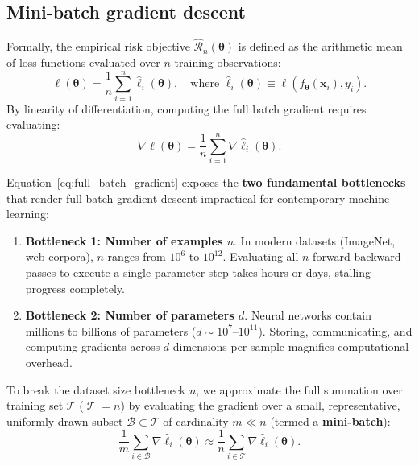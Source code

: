 \subsection{Mini-batch gradient descent}
\label{sec:two_bottlenecks_gd}
\label{sec:gradient_estimators_taxonomy}
\label{sec:algorithmic_cycle_epochs}

Formally, the empirical risk objective $\hat{\mathcal{R}}_n(\boldsymbol{\theta})$ is defined as the arithmetic mean of loss functions evaluated over $n$ training observations:
\begin{equation}
\ell(\boldsymbol{\theta}) = \frac{1}{n} \sum_{i=1}^n \hat{\ell}_i(\boldsymbol{\theta}), \quad \text{where } \hat{\ell}_i(\boldsymbol{\theta}) \equiv \ell(f_{\boldsymbol{\theta}}(\mathbf{x}_i), y_i).
\label{eq:sum_loss_structure}
\end{equation}
By linearity of differentiation, computing the full batch gradient requires evaluating:
\begin{equation}
\nabla \ell(\boldsymbol{\theta}) = \frac{1}{n} \sum_{i=1}^n \nabla \hat{\ell}_i(\boldsymbol{\theta}).
\label{eq:full_batch_gradient}
\end{equation}

Equation~\eqref{eq:full_batch_gradient} exposes the \textbf{two fundamental bottlenecks} that render full-batch gradient descent impractical for contemporary machine learning:
\begin{enumerate}
  \item \textbf{Bottleneck 1: Number of examples $n$}. In modern datasets (ImageNet, web corpora), $n$ ranges from $10^6$ to $10^{12}$. Evaluating all $n$ forward-backward passes to execute a single parameter step takes hours or days, stalling progress completely.
  \item \textbf{Bottleneck 2: Number of parameters $d$}. Neural networks contain millions to billions of parameters ($d \sim 10^7$--$10^{11}$). Storing, communicating, and computing gradients across $d$ dimensions per sample magnifies computational overhead.
\end{enumerate}

To break the dataset size bottleneck $n$, we approximate the full summation over training set $\mathcal{T}$ ($|\mathcal{T}| = n$) by evaluating the gradient over a small, representative, uniformly drawn subset $\mathcal{B} \subset \mathcal{T}$ of cardinality $m \ll n$ (termed a \textbf{mini-batch}):
\begin{equation}
\frac{1}{m} \sum_{i \in \mathcal{B}} \nabla \hat{\ell}_i(\boldsymbol{\theta}) \approx \frac{1}{n} \sum_{i \in \mathcal{T}} \nabla \hat{\ell}_i(\boldsymbol{\theta}).
\label{eq:minibatch_approximation}
\end{equation}

